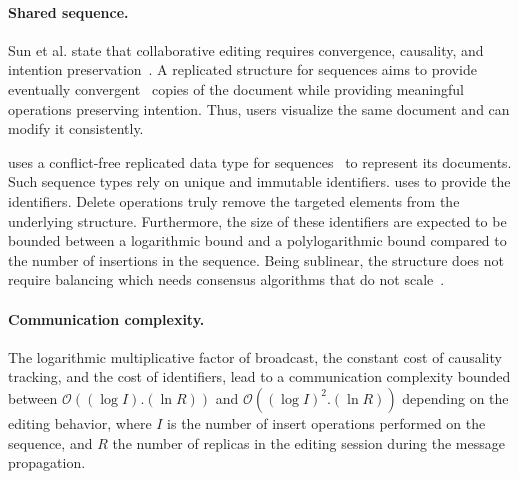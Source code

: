 \paragraph{Shared sequence.}
Sun et al. state that collaborative editing requires convergence, causality, and
intention preservation~\cite{sun1998achieving}.
A replicated structure for sequences aims to provide eventually
convergent~\cite{shapiro2011conflict} copies of the document while providing
meaningful operations preserving intention. Thus, users visualize the same
document and can modify it consistently.

\CRATE uses a conflict-free replicated data type for
sequences~\cite{shapiro2011conflict} to represent its documents. Such sequence
types rely on unique and immutable identifiers. \CRATE uses \LSEQ to provide the
identifiers. Delete operations truly remove the targeted elements from the
underlying structure. Furthermore, the size of these identifiers are expected to
be bounded between a logarithmic bound and a polylogarithmic bound compared to
the number of insertions in the sequence.
Being sublinear, the structure does not require balancing which needs consensus
algorithms that do not scale~\cite{mostefaoui2015signature}.


\paragraph{Communication complexity.}

The logarithmic multiplicative factor of broadcast, the constant cost of
causality tracking, and the cost of identifiers, lead to a communication
complexity bounded between $\mathcal{O}((\log I).(\ln R))$ and
$\mathcal{O}((\log I)^2.(\ln R))$ depending on the editing behavior, where $I$
is the number of insert operations performed on the sequence, and $R$ the number
of replicas in the editing session during the message propagation.

